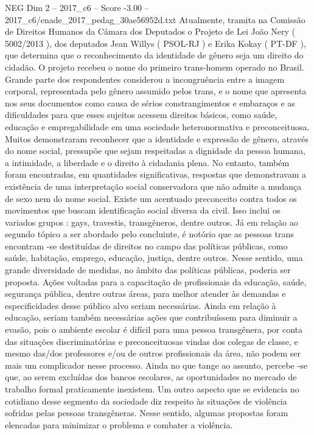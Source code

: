 \begin{textsample}{NEG Dim 2 – 2017\_c6 – Score -3.00 – 2017\_c6/enade\_2017\_pedag\_30ae56952d.txt}
Atualmente, tramita na Comissão de Direitos Humanos da Câmara dos Deputados o Projeto de Lei João Nery ( 5002/2013 ), dos deputados Jean Willys ( PSOL-RJ ) e Erika Kokay ( PT-DF ), que determina que o reconhecimento da identidade de gênero seja um direito do cidadão.
O projeto recebeu o nome do primeiro trans-homem operado no Brasil.
Grande parte dos respondentes considerou a incongruência entre a imagem corporal, representada pelo gênero assumido pelos trans, e o nome que apresenta nos seus documentos como causa de sérios constrangimentos e embaraços e as dificuldades para que esses sujeitos acessem direitos básicos, como saúde, educação e empregabilidade em uma sociedade heteronormativa e preconceituosa.
Muitos demonstraram reconhecer que a identidade e expressão de gênero, através do nome social, pressupõe que sejam respeitadas a dignidade da pessoa humana, a intimidade, a liberdade e o direito à cidadania plena.
No entanto, também foram encontradas, em quantidades significativas, respostas que demonstravam a existência de uma interpretação social conservadora que não admite a mudança de sexo nem do nome social.
Existe um acentuado preconceito contra todos os movimentos que buscam identificação social diversa da civil.
Isso inclui os variados grupos : gays, travestis, transgêneros, dentre outros.
Já em relação ao segundo tópico a ser abordado pelo concluinte, é notório que as pessoas trans encontram -se destituídas de direitos no campo das políticas públicas, como saúde, habitação, emprego, educação, justiça, dentre outros.
Nesse sentido, uma grande diversidade de medidas, no âmbito das políticas públicas, poderia ser proposta.
Ações voltadas para a capacitação de profissionais da educação, saúde, segurança pública, dentre outras áreas, para melhor atender às demandas e especificidades desse público alvo seriam necessárias.
Ainda em relação à educação, seriam também necessárias ações que contribuíssem para diminuir a evasão, pois o ambiente escolar é difícil para uma pessoa transgênera, por conta das situações discriminatórias e preconceituosas vindas dos colegas de classe, e mesmo das/dos professores e/ou de outros profissionais da área, não podem ser mais um complicador nesse processo.
Ainda no que tange ao assunto, percebe -se que, ao serem excluídas dos bancos escolares, as oportunidades no mercado de trabalho formal praticamente inexistem.
Um outro aspecto que se evidencia no cotidiano desse segmento da sociedade diz respeito às situações de violência sofridas pelas pessoas transgêneras.
Nesse sentido, algumas propostas foram elencadas para minimizar o problema e combater a violência.

\end{textsample}
